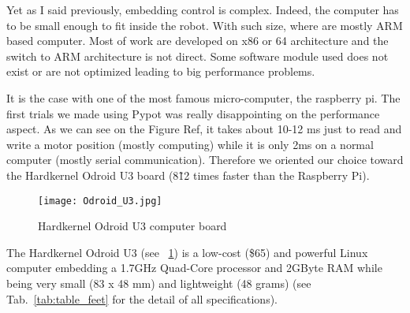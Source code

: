 Yet as I said previously, embedding control is complex. Indeed, the computer has to be small enough to fit inside the robot. With such size, where are mostly ARM based computer. Most of work are developed on x86 or 64 architecture and the switch to ARM architecture is not direct. Some software module used does not exist or are not optimized leading to big performance problems.

It is the case with one of the most famous micro-computer, the raspberry pi. The first trials we made using Pypot was really disappointing on the performance aspect. As we can see on the Figure Ref, it takes about 10-12 ms just to read and write a motor position (mostly computing) while it is only 2ms on a normal computer (mostly serial communication). Therefore we oriented our choice toward the Hardkernel Odroid U3 board (8\~12 times faster than the Raspberry Pi).

\begin{figure}[!h]
    \begin{center}
        \texttt{[image: Odroid\_U3.jpg]}
    \end{center}
    \caption{Hardkernel Odroid U3 computer board}
    \label{fig:odroid_U3}
\end{figure}

The Hardkernel Odroid U3 (see \figurename~\ref{fig:odroid_U3}) is a low-cost (\$65) and powerful Linux computer embedding a 1.7GHz Quad-Core processor and 2GByte RAM while being very small (83 x 48 mm) and lightweight (48 grams) (see Tab.~\ref{tab:table_feet} for the detail of all specifications).


